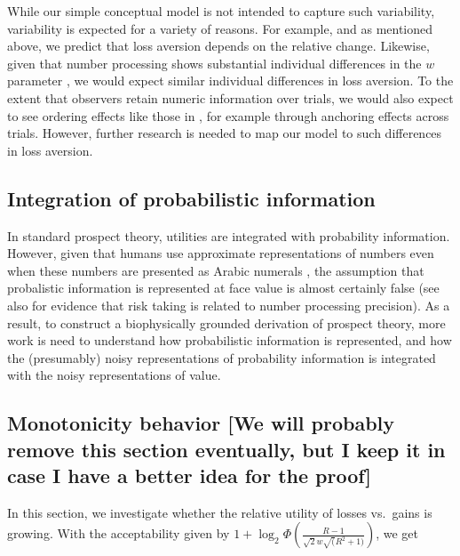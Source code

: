 \documentclass[
]{article}
\begin{document}
While our simple conceptual model is not intended to capture such
variability, variability is expected for a variety of reasons. For
example, and as mentioned above, we predict that loss aversion depends
on the relative change. Likewise, given that number processing shows
substantial individual differences in the \(w\) parameter
\citep{Halberda2008}, we would expect similar individual differences in
loss aversion. To the extent that observers retain numeric information
over trials, we would also expect to see ordering effects like those in
\citep{Yechiam2025}, for example through anchoring effects across
trials. However, further research is needed to map our model to such
differences in loss aversion.

\subsection{Integration of probabilistic
information}\label{integration-of-probabilistic-information}

In standard prospect theory, utilities are integrated with probability
information. However, given that humans use approximate representations
of numbers even when these numbers are presented as Arabic numerals
\citep{Moyer1967, Buckley1974, Hinrichs1981, Dehaene1990}, the
assumption that probalistic information is represented at face value is
almost certainly false (see also \citep{BarrettoGarcia2023, Khaw2020}
for evidence that risk taking is related to number processing
precision). As a result, to construct a biophysically grounded
derivation of prospect theory, more work is need to understand how
probabilistic information is represented, and how the (presumably) noisy
representations of probability information is integrated with the noisy
representations of value.

\subsection{Monotonicity behavior {[}We will probably remove this
section eventually, but I keep it in case I have a better idea for the
proof{]}}\label{monotonicity-behavior-we-will-probably-remove-this-section-eventually-but-i-keep-it-in-case-i-have-a-better-idea-for-the-proof}

In this section, we investigate whether the relative utility of losses
vs.~gains is growing. With the acceptability given by
\(1 + \log_2 \Phi\left(\frac{R-1}{\sqrt{2}w \sqrt(R^2 + 1)}\right)\), we
get
\end{document}
